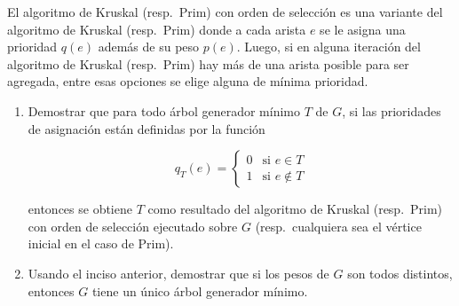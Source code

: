 
 
 \item\Obligatorio El algoritmo de Kruskal (resp.\ Prim) con orden de selección es una variante del algoritmo de Kruskal (resp.\ Prim) donde a cada arista $e$ se le asigna una prioridad $q(e)$ además de su peso $p(e)$. Luego, si en alguna iteración del algoritmo de Kruskal (resp.\ Prim) hay más de una arista posible para ser agregada, entre esas opciones se elige alguna de mínima prioridad.
 
 \begin{enumerate}[label=$\alph*)$,ref=$\alph*)$]
  \item Demostrar que para todo árbol generador mínimo $T$ de $G$, si las prioridades de asignación están definidas por la función
  
  
$$
    q_T(e) =
    \begin{cases}
      0 &  \text{si $e \in T$}  \\
      1 &  \text{si $e \notin T$}
    \end{cases}
 $$
 
 
 entonces se obtiene $T$ como resultado del algoritmo de Kruskal (resp.\ Prim) con orden de selección ejecutado sobre $G$ (resp.\ cualquiera sea el vértice inicial en el caso de Prim).
  \item Usando el inciso anterior, demostrar que si los pesos de $G$ son todos distintos, entonces $G$ tiene un único árbol generador mínimo.
 \end{enumerate}

